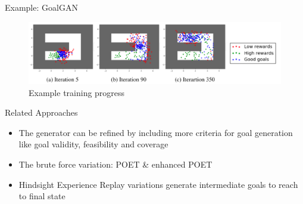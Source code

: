 \begin{frame}[c]{Example: GoalGAN }
	
	\begin{figure}
		\centering
		\includegraphics[scale=0.37]{images/goalgan.png}
		\caption{Example training progress}
	\end{figure}
	
\end{frame}
\begin{frame}[c]{Related Approaches}
	
	\begin{itemize}
		\item The generator can be refined by including more criteria for goal generation like goal validity, feasibility and coverage 
		\item The brute force variation: POET  \& enhanced POET 
		\item Hindsight Experience Replay  variations generate intermediate goals to reach to final state
	\end{itemize}
	
\end{frame}

